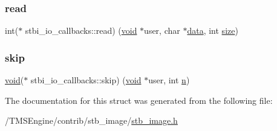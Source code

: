 \mbox{\label{structstbi__io__callbacks_a623e46b3a2a019611601409926283a88}} 
\subsubsection{\texorpdfstring{read}{read}}
{\footnotesize\ttfamily int($\ast$ stbi\+\_\+io\+\_\+callbacks\+::read) (\hyperlink{_s_d_l__opengles2__gl2ext_8h_ae5d8fa23ad07c48bb609509eae494c95}{void} $\ast$user, char $\ast$\hyperlink{_s_d_l__opengl_8h_a2e335d56e2846b0fea47eed068b2d34a}{data}, int \hyperlink{_s_d_l__opengl__glext_8h_a3d1e3edfcf61ca2d831883e1afbad89e}{size})}

\mbox{\label{structstbi__io__callbacks_a257aac5480a90a6c4b8fbe86c1b01068}} 
\subsubsection{\texorpdfstring{skip}{skip}}
{\footnotesize\ttfamily \hyperlink{_s_d_l__opengles2__gl2ext_8h_ae5d8fa23ad07c48bb609509eae494c95}{void}($\ast$ stbi\+\_\+io\+\_\+callbacks\+::skip) (\hyperlink{_s_d_l__opengles2__gl2ext_8h_ae5d8fa23ad07c48bb609509eae494c95}{void} $\ast$user, int \hyperlink{_s_d_l__opengl__glext_8h_ae2b4646468bc89d0ba646f5cf838e051}{n})}



The documentation for this struct was generated from the following file\+:\begin{DoxyCompactItemize}
\item 
/\+T\+M\+S\+Engine/contrib/stb\+\_\+image/\hyperlink{stb__image_8h}{stb\+\_\+image.\+h}\end{DoxyCompactItemize}
